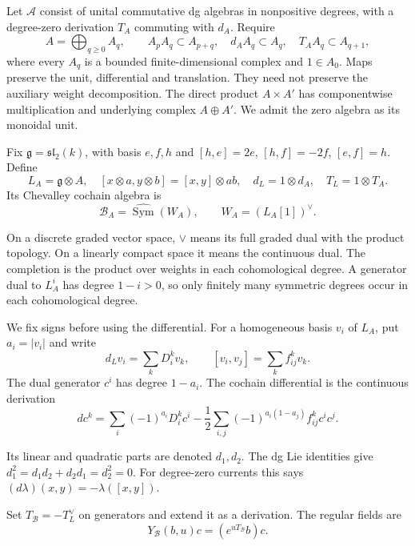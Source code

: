 Let $\mathcal A$ consist of unital commutative dg algebras in
nonpositive degrees, with a degree-zero derivation $T_A$ commuting
with $d_A$. Require
\[
 A=\bigoplus_{q\ge0}A_q,\qquad A_pA_q\subset A_{p+q},
 \quad d_AA_q\subset A_q,\quad T_AA_q\subset A_{q+1},
\]
where every $A_q$ is a bounded finite-dimensional complex and
$1\in A_0$. Maps preserve the unit, differential and translation.
They need not preserve the auxiliary weight decomposition.
The direct product $A\times A'$ has componentwise multiplication
and underlying complex $A\oplus A'$. We admit the zero algebra as
its monoidal unit.

Fix $\mathfrak g=\mathfrak{sl}_2(k)$, with basis $e,f,h$ and
$[h,e]=2e$, $[h,f]=-2f$, $[e,f]=h$. Define
\begin{equation}\label{cycmp:eq:current-lie}
 L_A=\mathfrak g\otimes A,\quad
 [x\otimes a,y\otimes b]=[x,y]\otimes ab,
 \quad d_L=1\otimes d_A,\quad T_L=1\otimes T_A.
\end{equation}
Its Chevalley cochain algebra is
\begin{equation}\label{cycmp:eq:current-cochains}
 \mathcal B_A=\widehat{\operatorname{Sym}}(W_A),
 \qquad W_A=(L_A[1])^\vee.
\end{equation}

On a discrete graded vector space, $\vee$ means its full graded
dual with the product topology. On a linearly compact space it means
the continuous dual. The completion is the product over weights
in each cohomological degree. A generator dual to $L_A^i$ has
degree $1-i>0$, so only finitely many symmetric degrees occur in
each cohomological degree.

We fix signs before using the differential. For a homogeneous basis
$v_i$ of $L_A$, put $a_i=|v_i|$ and write
\[
 d_Lv_i=\sum_k D_i^k v_k,\qquad
 [v_i,v_j]=\sum_k f_{ij}^k v_k.
\]
The dual generator $c^i$ has degree $1-a_i$. The cochain
differential is the continuous derivation
\begin{equation}\label{cycmp:eq:ce-signs}
 dc^k=\sum_i(-1)^{a_i}D_i^k c^i
       -\frac12\sum_{i,j}(-1)^{a_i(1-a_j)}f_{ij}^k c^ic^j.
\end{equation}

Its linear and quadratic parts are denoted $d_1,d_2$.
The dg Lie identities give
$d_1^2=d_1d_2+d_2d_1=d_2^2=0$.
For degree-zero currents this says
$(d\lambda)(x,y)=-\lambda([x,y])$.

Set $T_{\mathcal B}=-T_L^\vee$ on generators and extend it as a
derivation. The regular fields are
\begin{equation}\label{cycmp:eq:regular-fields}
 Y_{\mathcal B}(b,u)c=(e^{uT_{\mathcal B}}b)c.
\end{equation}

